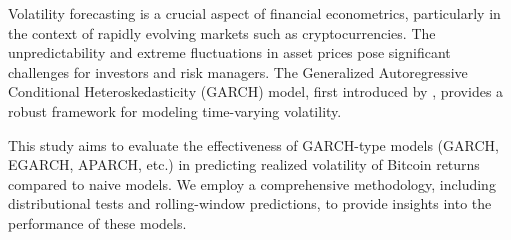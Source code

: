 


\par 
Volatility forecasting is a crucial aspect of financial econometrics, particularly in the context of rapidly evolving markets such as cryptocurrencies. The unpredictability and extreme fluctuations in asset prices pose significant challenges for investors and risk managers. The Generalized Autoregressive Conditional Heteroskedasticity (GARCH) model, first introduced by \cite{bollerslev1987}, provides a robust framework for modeling time-varying volatility.

This study aims to evaluate the effectiveness of GARCH-type models (GARCH, EGARCH, APARCH, etc.) in predicting realized volatility of Bitcoin returns compared to naive models. We employ a comprehensive methodology, including distributional tests and rolling-window predictions, to provide insights into the performance of these models.
